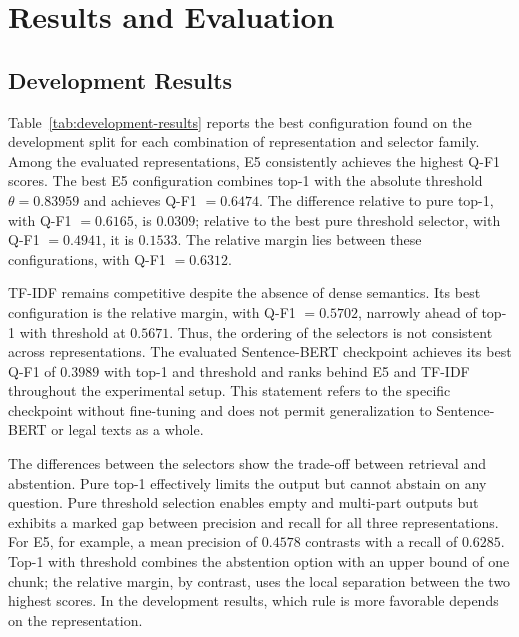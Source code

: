 \documentclass[11pt]{article}
\begin{document}
\section{Results and Evaluation}

\subsection{Development Results}

Table~\ref{tab:development-results} reports the best configuration found on the development split for each combination of representation and selector family. Among the evaluated representations, E5 consistently achieves the highest Q-F1 scores. The best E5 configuration combines top-1 with the absolute threshold $\theta=0.83959$ and achieves Q-F1 $=0.6474$. The difference relative to pure top-1, with Q-F1 $=0.6165$, is $0.0309$; relative to the best pure threshold selector, with Q-F1 $=0.4941$, it is $0.1533$. The relative margin lies between these configurations, with Q-F1 $=0.6312$.

TF-IDF remains competitive despite the absence of dense semantics. Its best configuration is the relative margin, with Q-F1 $=0.5702$, narrowly ahead of top-1 with threshold at $0.5671$. Thus, the ordering of the selectors is not consistent across representations. The evaluated Sentence-BERT checkpoint achieves its best Q-F1 of $0.3989$ with top-1 and threshold and ranks behind E5 and TF-IDF throughout the experimental setup. This statement refers to the specific checkpoint without fine-tuning and does not permit generalization to Sentence-BERT or legal texts as a whole.

The differences between the selectors show the trade-off between retrieval and abstention. Pure top-1 effectively limits the output but cannot abstain on any question. Pure threshold selection enables empty and multi-part outputs but exhibits a marked gap between precision and recall for all three representations. For E5, for example, a mean precision of $0.4578$ contrasts with a recall of $0.6285$. Top-1 with threshold combines the abstention option with an upper bound of one chunk; the relative margin, by contrast, uses the local separation between the two highest scores. In the development results, which rule is more favorable depends on the representation.
\end{document}
